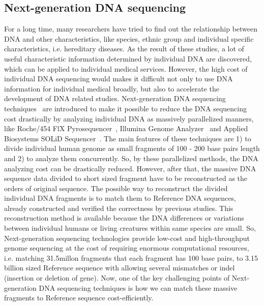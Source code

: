 \subsection{Next-generation DNA sequencing} For a long time, many researchers
have tried to find out the relationship between DNA and other characteristics,
like species, ethnic group and individual specific characteristics, i.e.
hereditary diseases.  As the result of these studies, a lot of useful
characteristic information determined by individual DNA are discovered, which
can be applied to individual medical services. However, the high cost of
individual DNA sequencing would makes it difficult not only to use DNA
information for individual medical broadly, but also to accelerate the
development of DNA related studies.  Next-generation DNA sequencing
techniques~\cite{genome_sequence_0, genome_sequence_1, genome_sequence_2,
genome_sequence_3, genome_sequence_4} are introduced to make it possible to
reduce the DNA sequencing cost drastically by analyzing individual DNA as
massively parallelized manners, like Roche/454 FlX
Pyrosequencer~\cite{roche445}, Illumina Genome Analyzer~\cite{illumina} and
Applied Biosystems SOLiD Sequencer~\cite{solid}. The main features of these
techniques are 1) to divide individual human genome as small fragments of 100 -
200 base pairs length and 2) to analyze them concurrently. So, by these
parallelized methods, the DNA analyzing cost can be drastically reduced.
However, after that, the massive DNA sequence data divided to short sized
fragment have to be reconstructed as the orders of original sequence. The
possible way to reconstruct the divided individual DNA fragments is to match
them to Reference DNA sequences, already constructed and verified the
correctness by previous studies. This reconstruction method is available
because the DNA differences or variations between individual humans or living
creatures within same species are small.  So, Next-generation sequencing
technologies provide low-cost and high-throughput genome sequencing at the cost
of requiring enormous computational resources, i.e. matching 31.5millon
fragments that each fragment has 100 base pairs, to 3.15 billion sized
Reference sequence with allowing several mismatches or indel (insertion or
deletion of gene). Now, one of the key challenging points of Next-generation
DNA sequencing techniques is how we can match these massive fragments to
Reference sequence cost-efficiently. \\

